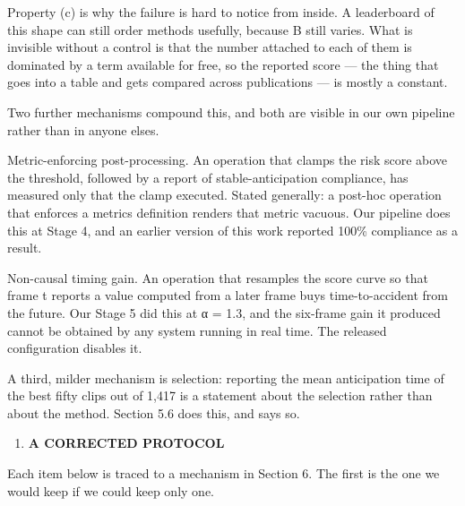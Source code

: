 Property (c) is why the failure is hard to notice from inside. A leaderboard of this shape can still order methods usefully, because B still varies. What is invisible without a control is that the number attached to each of them is dominated by a term available for free, so the reported score --- the thing that goes into a table and gets compared across publications --- is mostly a constant.

Two further mechanisms compound this, and both are visible in our own pipeline rather than in anyone else\textquotesingle s.

Metric-enforcing post-processing. An operation that clamps the risk score above the threshold, followed by a report of stable-anticipation compliance, has measured only that the clamp executed. Stated generally: a post-hoc operation that enforces a metric\textquotesingle s definition renders that metric vacuous. Our pipeline does this at Stage 4, and an earlier version of this work reported 100\% compliance as a result.

Non-causal timing gain. An operation that resamples the score curve so that frame t reports a value computed from a later frame buys time-to-accident from the future. Our Stage 5 did this at α = 1.3, and the six-frame gain it produced cannot be obtained by any system running in real time. The released configuration disables it.

A third, milder mechanism is selection: reporting the mean anticipation time of the best fifty clips out of 1,417 is a statement about the selection rather than about the method. Section 5.6 does this, and says so.

\begin{enumerate}
\def\labelenumi{\arabic{enumi}.}
\setcounter{enumi}{5}
\item
  \textbf{A CORRECTED PROTOCOL}
\end{enumerate}

Each item below is traced to a mechanism in Section 6. The first is the one we would keep if we could keep only one.

